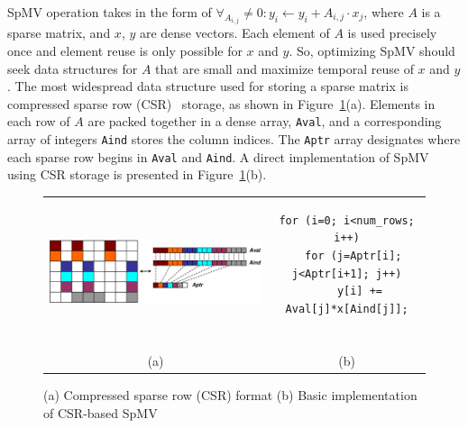 SpMV operation takes in the form of $\forall_{A_{i,j}} \neq 0:y_{i}
\leftarrow y_{i} + A_{i,j} \cdot x_{j}$, where $A$ is a sparse matrix,
and $x$, $y$ are dense vectors. Each element of $A$ is used precisely
once and element reuse is only possible for $x$ and $y$. So,
optimizing SpMV should seek data structures for $A$ that are small and
maximize temporal reuse of $x$ and $y$. The most widespread data
structure used for storing a sparse matrix is compressed sparse row
(CSR)~\cite{vuduc-thesis} storage, as shown in
Figure~\ref{fig:spmv}(a). Elements in each row of $A$ are packed
together in a dense array, \texttt{Aval}, and a corresponding array of
integers \texttt{Aind} stores the column indices. The \texttt{Aptr}
array designates where each sparse row begins in \texttt{Aval} and
\texttt{Aind}. A direct implementation of SpMV using CSR storage is
presented in Figure~\ref{fig:spmv}(b).

\begin{figure}[htp]
\centering
\vspace{.2in}
\begin{tabular}{cc}
\begin{minipage}[b]{.5\textwidth}
\centering
\includegraphics[width=.8\textwidth]{figures/spmv.eps}  
\end{minipage}
&
\begin{minipage}[b]{.5\textwidth}
\scriptsize
\begin{verbatim}
for (i=0; i<num_rows; i++)
  for (j=Aptr[i]; j<Aptr[i+1]; j++)
    y[i] += Aval[j]*x[Aind[j]];


\end{verbatim}
\end{minipage}\\
(a) & (b)\\
\end{tabular}
\vspace{-.1in}
\caption{(a) Compressed sparse row (CSR) format (b) Basic implementation of CSR-based SpMV}
\label{fig:spmv}
\end{figure}

